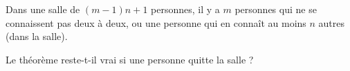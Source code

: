 Dans une salle de $(m - 1)n + 1$ personnes, il y a $m$ personnes qui ne se connaissent pas deux à deux, ou une personne qui en connaît au moins $n$ autres (dans la salle).

Le théorème reste-t-il vrai si une personne quitte la salle ?
